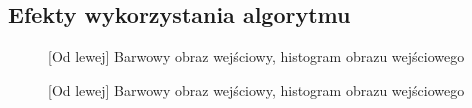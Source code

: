 \documentclass[a4paper,12pt, titlepage]{report}
\begin{document}
\subsection*{Efekty wykorzystania algorytmu}
\begin{figure}[h]
    \centering
    \caption{[Od lewej] Barwowy obraz wejściowy, histogram obrazu wejściowego}%
    \label{fig:rysunek}%
\end{figure}
\FloatBarrier
\begin{figure}[h]
    \centering
    \caption{[Od lewej] Barwowy obraz wejściowy, histogram obrazu wejściowego}%
    \label{fig:rysunek}%
\end{figure}
\FloatBarrier
\end{document}
